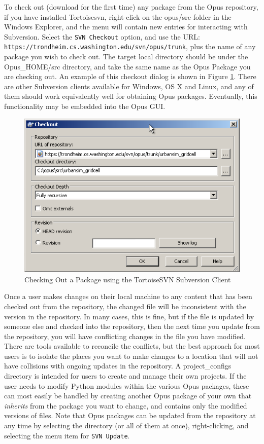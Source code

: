 To check out (download for the first time) any package from the Opus repository, if you have installed Tortoisesvn, right-click on the opus/src folder in the Windows Explorer, and the menu will contain new entries for interacting with Subversion.  Select the \verb#SVN Checkout# option, and use the URL: \verb#https://trondheim.cs.washington.edu/svn/opus/trunk#, plus the name of any package you wish to check out.  The target local directory should be under the Opus\_HOME/src directory, and take the same name as the Opus Package you are checking out.  An example of this checkout dialog is shown in Figure \ref{fig:tortoisesvn}.  There are other Subversion clients available for Windows, OS X and Linux, and any of them should work equivalently well for obtaining Opus packages.  Eventually, this functionality may be embedded into the Opus GUI.

\begin{figure}[htp]
\begin{center}
\includegraphics[scale=0.4]{graphics/tortoisesvn.png}
\end{center}
\caption{Checking Out a Package using the TortoiseSVN Subversion Client}
\label{fig:tortoisesvn}
\end{figure}

Once a user makes changes on their local machine to any content that has been checked out from the repository, the changed file will be inconsistent with the version in the repository.  In many cases, this is fine, but if the file is updated by someone else and checked into the repository, then the next time you update from the repository, you will have conflicting changes in the file you have modified.  There are tools available to reconcile the conflicts, but the best approach for most users is to isolate the places you want to make changes to a location that will not have collisions with ongoing updates in the repository.  A project\_configs directory is intended for users to create and manage their own projects.  If the user needs to modify Python modules within the various Opus packages, these can most easily be handled by creating another Opus package of your own that \emph{inherits} from the package you want to change, and contains only the modified versions of files.   Note that Opus packages can be updated from the repository at any time by selecting the directory (or all of them at once), right-clicking, and selecting the menu item for \verb#SVN Update#.

